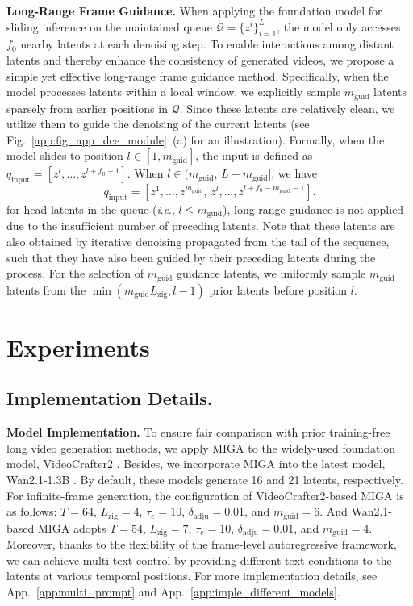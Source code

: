 \documentclass{article}
\theoremstyle{plain}
\theoremstyle{definition}
\theoremstyle{remark}
\newcommand{\ie}{\textit{i}.\textit{e}.}
\begin{document}
\textbf{Long-Range Frame Guidance.}
When applying the foundation model for sliding inference on the maintained queue $\mathcal{Q} = \{z^{i}\}_{i=1}^{L}$, the model only accesses $f_0$ nearby latents at each denoising step.
To enable interactions among distant latents \cite{feng2024memvlt} and thereby enhance the consistency of generated videos, we propose a simple yet effective long-range frame guidance method. 
Specifically, when the model processes latents within a local window, we explicitly sample $m_\mathrm{guid}$ latents sparsely from earlier positions in $\mathcal{Q}$.
Since these latents are relatively clean, we utilize them to guide the denoising of the current latents (see Fig.~\ref{app:fig_app_dce_module}~(a) for an illustration).
Formally, when the model slides to position $l \in [1, m_{\mathrm{guid}}]$, 
the input is defined as
$q_{\mathrm{input}} = [z^{l}, \ldots, z^{l+f_0-1}]$.
When $l \in (m_{\mathrm{guid}},\, L - m_{\mathrm{guid}}]$, we have
\begin{equation}
q_{\mathrm{input}} = [z^{1}, \ldots, z^{m_{\mathrm{guid}}},\, z^{l}, \ldots, z^{l+f_0-m_{\mathrm{guid}}-1}].
\end{equation}
for head latents in the queue (\ie, $l \leq m_\mathrm{guid}$), long-range guidance is not applied due to the insufficient number of preceding latents.
Note that these latents are also obtained by iterative denoising propagated from the tail of the sequence, such that they have also been guided by their preceding latents during the process. 
For the selection of $m_\mathrm{guid}$ guidance latents, we uniformly sample $m_\mathrm{guid}$ latents from the $\min(m_\mathrm{guid}L_{\mathrm{zig}}, l-1)$ prior latents before position $l$. 




\section{Experiments}
\subsection{Implementation Details.}
\label{exp:imp}


\textbf{Model Implementation.}
To ensure fair comparison with prior training-free long video generation methods, we apply MIGA to the widely-used foundation model, VideoCrafter2 \cite{chen2024videocrafter2}. Besides, we incorporate MIGA into the latest model, Wan2.1-1.3B \cite{wan2025wan}.
By default, these models generate 16 and 21 latents, respectively.
For infinite-frame generation, the configuration of VideoCrafter2-based MIGA is as follows: $T=64$, $L_{\mathrm{zig}}=4$, $\tau_{e}=10$, $\delta_{\mathrm{adju}}=0.01$, and $m_{\mathrm{guid}}=6$. And Wan2.1-based MIGA adopts $T=54$, $L_{\mathrm{zig}}=7$, $\tau_e=10$, $\delta_{\mathrm{adju}}=0.01$, and $m_{\mathrm{guid}}=4$. 
Moreover, thanks to the flexibility of the frame-level autoregressive framework, we can achieve multi-text control by providing different text conditions to the latents at various temporal positions. 
For more implementation details, see App.~\ref{app:multi_prompt} and App.~\ref{app:imple_different_models}.
\end{document}
